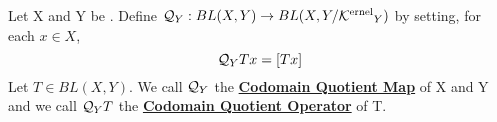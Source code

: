 \label{def:handedquotientoperators}
\newcommand{\CodomainQuotientOperator}[0]{\textbf{\hyperref[def:handedquotientoperators]{Codomain Quotient Operator}}\xspace}
\newcommand{\CodomainQuotientMap}[0]{\textbf{\hyperref[def:handedquotientoperators]{Codomain Quotient Map}}\xspace}
\begin{df}
    Let X and Y be \SeminormedSpaces.
    Define $\mathcal{Q}_Y:BL(X,Y) \to BL(X, Y/\textbf{\ensuremath{\mathcal{K}\rm^{ernel}}}_Y)$ by setting, 
    for each $x \in X$, 
    \begin{equation*} 
        \mathcal{Q}_YTx = [Tx]
    \end{equation*}
    Let $T \in BL(X,Y)$. 
    We call $\mathcal{Q}_Y$ the \CodomainQuotientMap of X and Y
    and we call $\mathcal{Q}_YT$ the 
    \CodomainQuotientOperator
    of T.
\end{df}
